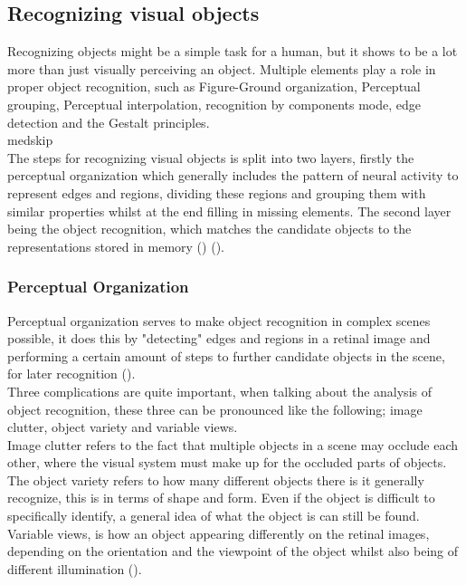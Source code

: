 \documentclass{article}
\newcommand{\goodcite}[1]{ {(\cite{#1})}}
\begin{document}

\subsection{Recognizing visual objects}%
Recognizing objects might be a simple task for a human, but it shows to be a lot more than just visually perceiving an object. Multiple elements play a role in proper object recognition, such as Figure-Ground organization, Perceptual grouping, Perceptual interpolation, recognition by components mode, edge detection and the Gestalt principles.\\medskip \\
The steps for recognizing visual objects is split into two layers, firstly the perceptual organization which generally includes the pattern of neural activity to represent edges and regions, dividing these regions and grouping them with similar properties whilst at the end filling in missing elements. The second layer being the object recognition, which matches the candidate objects to the representations stored in memory\goodcite{hsp}\goodcite{bieder}.

\subsubsection{Perceptual Organization}
\label{sec:perceptialorganization}
Perceptual organization serves to make object recognition in complex scenes possible, it does this by "detecting" edges and regions in a retinal image and performing a certain amount of steps to further candidate objects in the scene, for later recognition\goodcite{hsp}.\\
Three complications are quite important, when talking about the analysis of object recognition, these three can be pronounced like the following; image clutter, object variety and variable views.\\
Image clutter refers to the fact that multiple objects in a scene may occlude each other, where the visual system must make up for the occluded parts of objects. The object variety refers to how many different objects there is it generally recognize, this is in terms of shape and form. Even if the object is difficult to specifically identify, a general idea of what the object is can still be found. Variable views, is how an object appearing differently on the retinal images, depending on the orientation and the viewpoint of the object whilst also being of different illumination\goodcite{hsp}.\\
\end{document}
